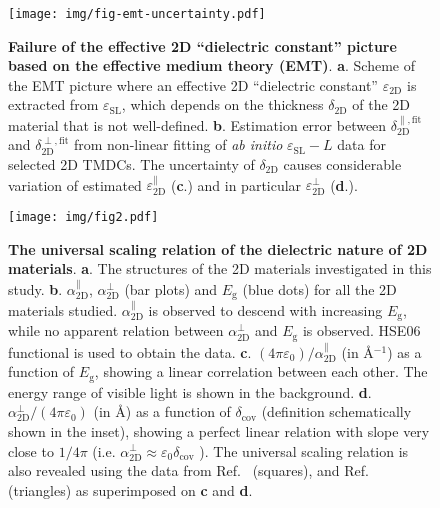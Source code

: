 \documentclass[journal=ancac3,manuscript=article,email=true,hyperref=true,keywords=false]{achemso}
\begin{document}
\begin{figure}[H]
  \centering
  \texttt{[image: img/fig-emt-uncertainty.pdf]}
  \caption{\label{fig-emt} \textbf{Failure of the effective 2D
      ``dielectric constant'' picture based on the effective medium
      theory (EMT)}. \textbf{a}.  Scheme of the EMT picture where an
    effective 2D ``dielectric constant'' $\varepsilon_{\mathrm{2D}}$
    is extracted from $\varepsilon_{\mathrm{SL}}$, which depends on
    the thickness $\delta_{\mathrm{2D}}$ of the 2D material that is
    not well-defined. \textbf{b}.  Estimation error between
    $\delta_{\mathrm{2D}}^{\parallel, \text{fit}}$ and
    $\delta_{\mathrm{2D}}^{\perp, \text{fit}}$ from non-linear fitting
    of \textit{ab initio} $\varepsilon_{\mathrm{SL}} - L$ data for selected
    2D TMDCs. The uncertainty of
    $\delta_{\mathrm{2D}}$ causes considerable variation of estimated
    $\varepsilon_{\mathrm{2D}}^{\parallel}$ (\textbf{c}.) and in
    particular $\varepsilon_{\mathrm{2D}}^{\perp}$ (\textbf{d}.).  }
\end{figure}


\begin{figure}[H]
\centering
\texttt{[image: img/fig2.pdf]}
\caption{\label{fig-3} \textbf{The universal scaling relation of the
    dielectric nature of 2D materials}. \textbf{a}. The structures of
  the 2D materials investigated in this
  study. \textbf{b}. $\alpha_{\mathrm{2D}}^{\parallel}$,
  $\alpha_{\mathrm{2D}}^{\perp}$ (bar plots) and $E_{\mathrm{g}}$
  (blue dots) for all the 2D materials studied.
  $\alpha_{\mathrm{2D}}^{\parallel}$ is observed to descend with
  increasing $E_{\mathrm{g}}$, while no apparent relation between
  $\alpha_{\mathrm{2D}}^{\perp}$ and $E_{\mathrm{g}}$ is
  observed. HSE06 functional is used to obtain the data. \textbf{c}.
  $(4\pi \varepsilon_{0})/\alpha_{\mathrm{2D}}^{\parallel}$ (in
  \AA{}$^{-1}$) as a function of $E_{\mathrm{g}}$, showing a linear
  correlation between each other. The energy range of visible light is
  shown in the background. \textbf{d}.
  $\alpha_{\mathrm{2D}}^{\perp}/(4\pi\varepsilon_{0})$ (in \AA{}) as a
  function of $\delta_{\mathrm{cov}}$ (definition schematically shown
  in the inset), showing a perfect linear relation with slope very
  close to $1/4\pi$ (i.e.
  $\alpha_{\mathrm{2D}}^{\perp} \approx \varepsilon_{0}
  \delta_{\mathrm{cov}}$ ). The universal scaling relation is also
  revealed using the data from Ref.~ (squares),
  and Ref.~ (triangles) as superimposed on
  \textbf{c} and \textbf{d}.}
\end{figure}
\end{document}
